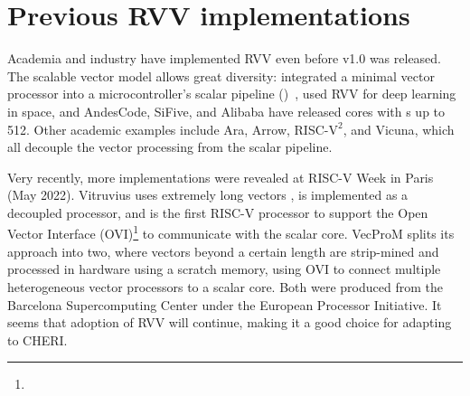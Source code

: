 \section{Previous RVV implementations\label{chap:bg:rvvend}}
Academia and industry have implemented RVV even before v1.0 was released.
The scalable vector model allows great diversity: \citeauthor{johnsMinimalRISCVVector2020} integrated a minimal vector processor into a microcontroller's scalar pipeline ()~\cite{johnsMinimalRISCVVector2020}, \citeauthor{dimascioOnBoardDecisionMaking2021} used RVV for deep learning in space\cite{dimascioOnBoardDecisionMaking2021}, and AndesCode, SiFive, and Alibaba have released cores with s up to 512\cite{AndesCoreNX27VProcessor}\cite{SiFiveIntelligenceX280}\cite{chenXuantie910CommercialMultiCore2020}.
Other academic examples include Ara\cite{cavalcanteAra1GHzScalable2020}, Arrow\cite{assirArrowRISCVVector2021}, RISC-$\text{V}^2$\cite{patsidisRISCV2ScalableRISCV2020}, and Vicuna\cite{platzerVicunaTimingPredictableRISCV2021}, which all decouple the vector processing from the scalar pipeline.

Very recently, more implementations were revealed at RISC-V Week in Paris (May 2022).
Vitruvius\cite{minerviniVitruviusAreaEfficientRISCV2022} uses extremely long vectors , is implemented as a decoupled processor, and is the first RISC-V processor to support the Open Vector Interface (OVI)\footnote{} to communicate with the scalar core.
VecProM\cite{mahaleRISCVVPUVery2021} splits its approach into two, where vectors beyond a certain length are strip-mined and processed in hardware using a scratch memory, using OVI to connect multiple heterogeneous vector processors to a scalar core.
Both were produced from the Barcelona Supercomputing Center under the European Processor Initiative.
It seems that adoption of RVV will continue, making it a good choice for adapting to CHERI.

